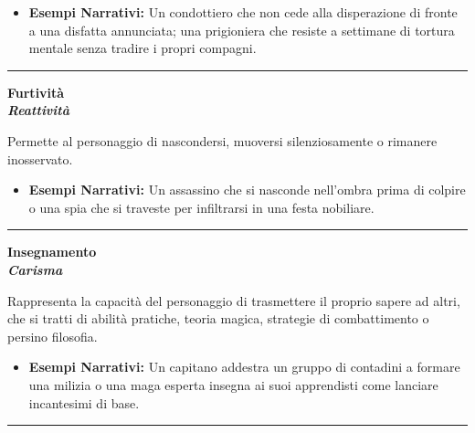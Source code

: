 \documentclass[../manuale_main.tex]{subfiles}
\begin{document}
\begin{itemize}
\item \textbf{Esempi Narrativi:} Un condottiero che non cede alla disperazione di fronte a una disfatta annunciata; una prigioniera che resiste a settimane di tortura mentale senza tradire i propri compagni.
\end{itemize}


\vspace{0.5cm}
\noindent
\begin{center}
\rule{\textwidth}{0.4pt} 
\end{center}
\vspace{0.5cm}

\begin{center}
\textbf{\large{Furtività}}\\ \textit{\textbf{Reattività}}\\
\end{center}
Permette al personaggio di nascondersi, muoversi silenziosamente o rimanere inosservato.

\begin{itemize}
\item \textbf{Esempi Narrativi:} Un assassino che si nasconde nell'ombra prima di colpire o una spia che si traveste per infiltrarsi in una festa nobiliare.
\end{itemize}


\vspace{0.5cm}
\noindent
\begin{center}
\rule{\textwidth}{0.4pt} 
\end{center}
\vspace{0.5cm}

\begin{center}
\textbf{\large{Insegnamento}}\\ \textit{\textbf{Carisma}}\\
\end{center}
Rappresenta la capacità del personaggio di trasmettere il proprio sapere ad altri, che si tratti di abilità pratiche, teoria magica, strategie di combattimento o persino filosofia.

\begin{itemize}
\item \textbf{Esempi Narrativi:} Un capitano addestra un gruppo di contadini a formare una milizia o una maga esperta insegna ai suoi apprendisti come lanciare incantesimi di base.
\end{itemize}


\vspace{0.5cm}
\noindent
\begin{center}
\rule{\textwidth}{0.4pt} 
\end{center}
\vspace{0.5cm}
\end{document}

